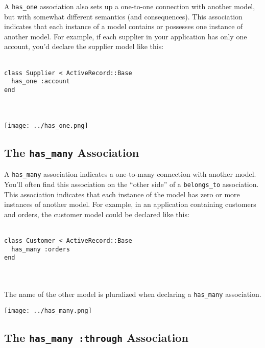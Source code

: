 \documentclass[10pt]{book}
\begin{document}
A \texttt{has\_one} association also sets up a one-to-one connection  with another model, but with somewhat different semantics (and  consequences). This association indicates that each instance of a model  contains or possesses one instance of another model. For example, if  each supplier in your application has only one account, you’d declare  the supplier model like this:
\\ \\
\begin{minipage}{\textwidth}{\scriptsize
\begin{verbatim}
class Supplier < ActiveRecord::Base
  has_one :account
end
\end{verbatim}}
\end{minipage}
\\ \\

\texttt{[image: ../has\_one.png]}
\newpage
\subsection{ The \texttt{has\_many} Association}

A \texttt{has\_many} association indicates a one-to-many connection with another model. You’ll often find this association on the “other side” of a \texttt{belongs\_to}  association. This association indicates that each instance of the model  has zero or more instances of another model. For example, in an  application containing customers and orders, the customer model could be  declared like this:
\\ \\
\begin{minipage}{\textwidth}{\scriptsize
\begin{verbatim}
class Customer < ActiveRecord::Base
  has_many :orders
end
\end{verbatim}}
\end{minipage}
\\ \\

The name of the other model is pluralized when declaring a \texttt{has\_many} association.

\texttt{[image: ../has\_many.png]}

\subsection{ The \texttt{has\_many :through} Association}
\end{document}
